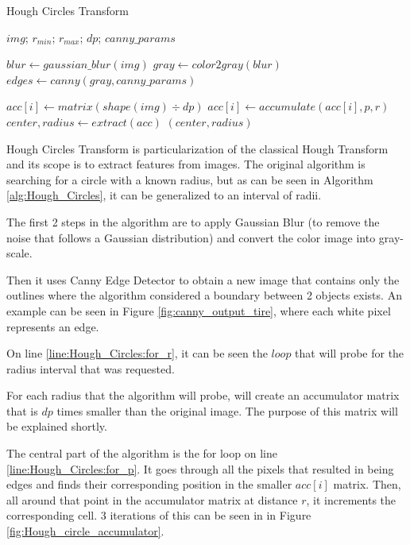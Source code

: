 \begin{algorithm}
    \caption{Hough Circles Transform}\label{alg:Hough_Circles}
    \begin{algorithmic}[1]
        \Require $img$; $r_{min}$; $r_{max}$; $dp$; $canny\_params$

        \State $blur \gets gaussian\_blur(img)$
        \State $gray \gets color2gray(blur)$
        \State $edges \gets canny(gray, canny\_params)$

        \label{line:Hough_Circles:for_r}
            \State $acc[i] \gets matrix(shape(img) \div dp)$
            \label{line:Hough_Circles:for_p}
                \State $acc[i] \gets accumulate(acc[i], p, r)$
            \EndFor
        \EndFor
    \State $center, radius \gets extract(acc)$\label{line:Hough_Circles:extract}
    \State \Return $(center, radius)$
    \end{algorithmic}
\end{algorithm}

Hough Circles Transform is particularization of the classical Hough Transform \cite{site:circular_hough_transform} and its scope is to extract features from images. The original algorithm is searching for a circle with a known radius, but as can be seen in Algorithm \ref{alg:Hough_Circles}, it can be generalized to an interval of radii.

The first 2 steps in the algorithm are to apply Gaussian Blur \cite{site:Gaussian_blur} (to remove the noise that follows a Gaussian distribution) and convert the color image into gray-scale.

Then it uses Canny Edge Detector \cite{site:Canny_edge_detection} to obtain a new image that contains only the outlines where the algorithm considered a boundary between 2 objects exists. An example can be seen in Figure \ref{fig:canny_output_tire}, where each white pixel represents an edge.

On line \ref{line:Hough_Circles:for_r}, it can be seen the $loop$ that will probe for the radius interval that was requested.

For each radius that the algorithm will probe, will create an accumulator matrix that is $dp$ times smaller than the original image. The purpose of this matrix will be explained shortly.

The central part of the algorithm is the for loop on line \ref{line:Hough_Circles:for_p}. It goes through all the pixels that resulted in being edges and finds their corresponding position in the smaller $acc[i]$ matrix. Then, all around that point in the accumulator matrix at distance $r$, it increments the corresponding cell. 3 iterations of this can be seen in in Figure \ref{fig:Hough_circle_accumulator}.

